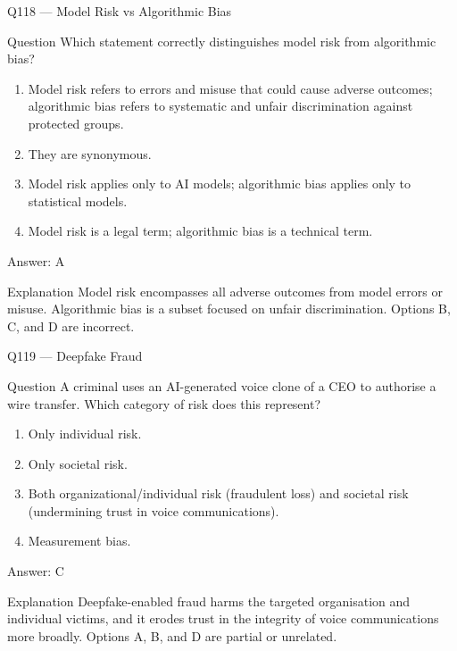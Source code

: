 \documentclass[aspectratio=169,8pt]{beamer}
\begin{document}
\begin{frame}{Q118 --- Model Risk vs Algorithmic Bias}
\begin{block}{Question}
Which statement correctly distinguishes model risk from algorithmic bias?
\end{block}
\begin{enumerate}
\item Model risk refers to errors and misuse that could cause adverse outcomes; algorithmic bias refers to systematic and unfair discrimination against protected groups.
\item They are synonymous.
\item Model risk applies only to AI models; algorithmic bias applies only to statistical models.
\item Model risk is a legal term; algorithmic bias is a technical term.
\end{enumerate}
\begin{exampleblock}{Answer: A}\end{exampleblock}
\begin{block}{Explanation}
Model risk encompasses all adverse outcomes from model errors or misuse. Algorithmic bias is a subset focused on unfair discrimination. Options B, C, and D are incorrect.
\end{block}
\end{frame}

\begin{frame}{Q119 --- Deepfake Fraud}
\begin{block}{Question}
A criminal uses an AI-generated voice clone of a CEO to authorise a wire transfer. Which category of risk does this represent?
\end{block}
\begin{enumerate}
\item Only individual risk.
\item Only societal risk.
\item Both organizational/individual risk (fraudulent loss) and societal risk (undermining trust in voice communications).
\item Measurement bias.
\end{enumerate}
\begin{exampleblock}{Answer: C}\end{exampleblock}
\begin{block}{Explanation}
Deepfake-enabled fraud harms the targeted organisation and individual victims, and it erodes trust in the integrity of voice communications more broadly. Options A, B, and D are partial or unrelated.
\end{block}
\end{frame}
\end{document}
